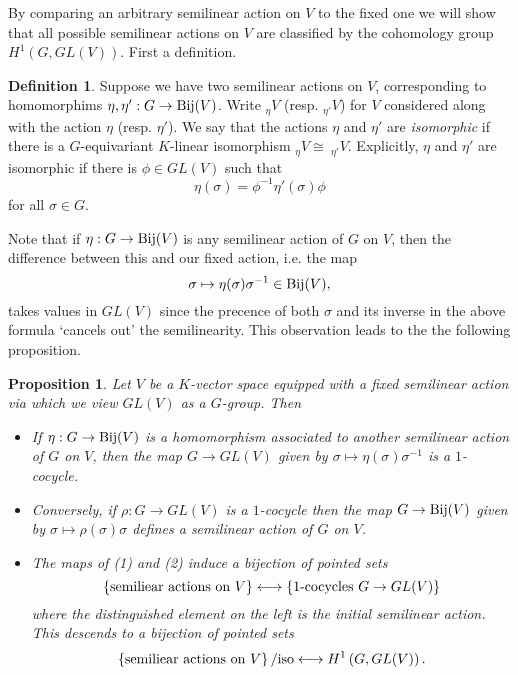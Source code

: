 \documentclass[11pt]{amsart}
\numberwithin{equation}{section}
\newtheorem{proposition}[equation]{Proposition}
\theoremstyle{remark}
\theoremstyle{remark}
\theoremstyle{remark}
\theoremstyle{definition}
\theoremstyle{definition}
\theoremstyle{definition}
\newtheorem{defi}[equation]{Definition}
\theoremstyle{definition}
\theoremstyle{definition}
\theoremstyle{definition}
\begin{document}
By comparing an arbitrary semilinear action on $V$ to the fixed one we will show that all possible  semilinear actions on $V$ are classified by the cohomology group $H^1\left(G,GL(V)\right)$. First a definition.

\begin{defi} \label{iso of actions defi}
Suppose we have two semilinear actions on $V$, corresponding to homomorphims $\eta,\eta':G\rightarrow \textup{Bij}(V)$. Write $_\eta V$ (resp. $_{\eta'} V$) for $V$ considered along with the action $\eta$ (resp. $\eta'$). We say that the actions $\eta$ and $\eta'$ are \textit{isomorphic} if there is a $G$-equivariant $K$-linear isomorphism $_\eta V\cong~_{\eta'} V$. Explicitly, $\eta$ and $\eta'$ are isomorphic if there is $\phi\in GL(V)$ such that 
\[\eta(\sigma)=\phi^{-1}\eta'(\sigma)\phi\]
for all $\sigma \in G$. 
\end{defi}%

Note that if $\eta:G\rightarrow \textup{Bij}(V)$ is any semilinear action of $G$ on $V$, then the difference between this and our fixed action, i.e. the map
\[\sigma \mapsto \eta(\sigma)\sigma^{-1}\in \textup{Bij}(V),\]
takes values in $GL(V)$ since the precence of both $\sigma$ and its inverse in the above formula `cancels out' the semilinearity. This observation leads to the the following proposition.

\begin{proposition} \label{actions vs cocycles}
Let $V$ be a $K$-vector space equipped with a fixed semilinear action via which we view $GL(V)$ as a $G$-group. Then
\begin{itemize}
\item[(1)] If $\eta:G\rightarrow \textup{Bij}(V)$ is a homomorphism associated to another semilinear action of $G$ on $V$, then the map $G\rightarrow GL(V)$ given by $\sigma \mapsto \eta(\sigma)\sigma^{-1}$ is a $1$-cocycle. 
\item[(2)] Conversely, if $\rho:G\rightarrow GL(V)$ is a $1$-cocycle then the map $G\rightarrow \textup{Bij}(V)$ given by $\sigma \mapsto \rho(\sigma)\sigma$ defines a semilinear action of $G$ on $V$.
\item[(3)] The maps of (1) and (2)  induce a bijection of pointed sets
\[\left\{\textup{semiliear actions on }V\right\}\longleftrightarrow \left\{\textup{1-cocycles }G\rightarrow GL(V)\right\}\]
where the distinguished element on the left is the initial semilinear action. This descends to a bijection of pointed sets 
\[\left\{\textup{semiliear actions on }V\right\}/\textup{iso}\longleftrightarrow H^1\left(G,GL(V)\right).\]
\end{itemize}
\end{proposition}
\end{document}
